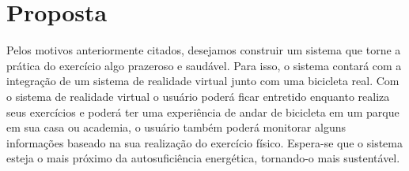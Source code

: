 \chapter[Proposta]{Proposta}

Pelos motivos anteriormente citados, desejamos construir um sistema que torne a prática do exercício algo prazeroso e saudável. Para isso, o sistema contará 
com a integração de um sistema de realidade virtual junto com uma bicicleta real. Com o sistema de realidade virtual o usuário poderá ficar entretido enquanto 
realiza seus exercícios e poderá ter uma experiência de andar de bicicleta em um parque em sua casa ou academia, o usuário também poderá monitorar
alguns informações baseado na sua realização do exercício físico. Espera-se que o sistema esteja o mais próximo da autosuficiência energética, tornando-o mais
sustentável.

